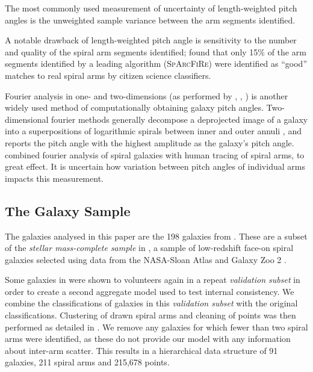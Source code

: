 The most commonly used measurement of uncertainty of length-weighted pitch angles is the unweighted sample variance between the arm segments identified.

A notable drawback of length-weighted pitch angle is sensitivity to the number and quality of the spiral arm segments identified; \citet{2017MNRAS.472.2263H} found that only 15\% of the arm segments identified by a leading algorithm (\textsc{SpArcFiRe}) were identified as ``good'' matches to real spiral arms by citizen science classifiers.

Fourier analysis in one- and two-dimensions (as performed by \citealt{2019arXiv190804246D}, \citealt{2012ApJS..199...33D}, \citealt{2018MNRAS.474.2594M}) is another widely used method of computationally obtaining galaxy pitch angles. Two-dimensional fourier methods generally decompose a deprojected image of a galaxy into a superpositions of logarithmic spirals between inner and outer annuli \citep{2012ApJS..199...33D}, and reports the pitch angle with the highest amplitude as the galaxy's pitch angle. \citet{2020MNRAS.493.3854H} combined fourier analysis of spiral galaxies with human tracing of spiral arms, to great effect. It is uncertain how variation between pitch angles of individual arms impacts this measurement.

\subsection{The Galaxy Sample}
The galaxies analysed in this paper are the 198 galaxies from \Lingard. These are a subset of the \textit{stellar mass-complete sample} in \citet{2017MNRAS.472.2263H}, a sample of low-redshift face-on spiral galaxies selected using data from the NASA-Sloan Atlas \citep{2011AJ....142...31B} and Galaxy Zoo 2 \citep{Willett2013:1308.3496v2}.

Some galaxies in \Lingard were shown to volunteers again in a repeat \textit{validation subset} in order to create a second aggregate model used to test internal consistency. We combine the classifications of galaxies in this \textit{validation subset} with the original classifications. Clustering of drawn spiral arms and cleaning of points was then performed as detailed in \Lingard. We remove any galaxies for which fewer than two spiral arms were identified, as these do not provide our model with any information about inter-arm scatter. This results in a hierarchical data structure of 91 galaxies, 211 spiral arms and 215,678 points.

